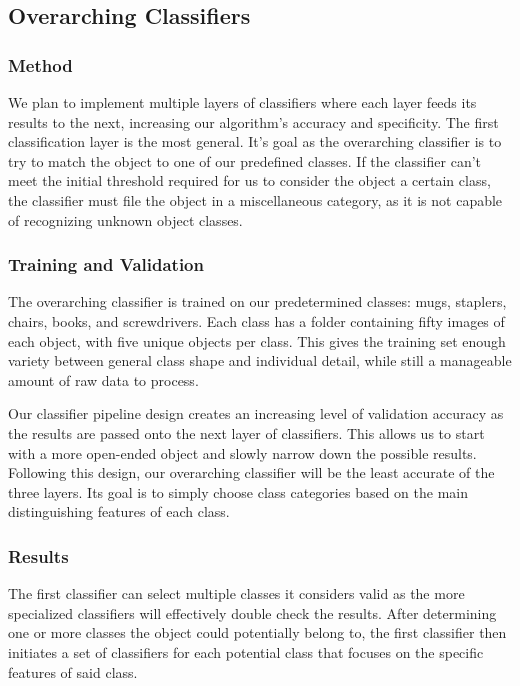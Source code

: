 \documentclass[draftclsnofoot, onecolumn, 10pt, compsoc]{IEEEtran}
\begin{document}
\subsection{Overarching Classifiers}

\subsubsection{Method}
We plan to implement multiple layers of classifiers where each layer feeds its results to the next, increasing our algorithm’s accuracy and specificity. The first classification layer is the most general. It’s goal as the overarching classifier is to try to match the object to one of our predefined classes. If the classifier can’t meet the initial threshold required for us to consider the object a certain class, the classifier must file the object in a miscellaneous category, as it is not capable of recognizing unknown object classes.

\subsubsection{Training and Validation}
The overarching classifier is trained on our predetermined classes: mugs, staplers, chairs, books, and screwdrivers. Each class has a folder containing fifty images of each object, with five unique objects per class. This gives the training set enough variety between general class shape and individual detail, while still a manageable amount of raw data to process. 

Our classifier pipeline design creates an increasing level of validation accuracy as the results are passed onto the next layer of classifiers. This allows us to start with a more open-ended object and slowly narrow down the possible results. Following this design, our overarching classifier will be the least accurate of the three layers. Its goal is to simply choose class categories based on the main distinguishing features of each class.

\subsubsection{Results}
The first classifier can select multiple classes it considers valid as the more specialized classifiers will effectively double check the results. After determining one or more classes the object could potentially belong to, the first classifier then initiates a set of classifiers for each potential class that focuses on the specific features of said class.
\end{document}
